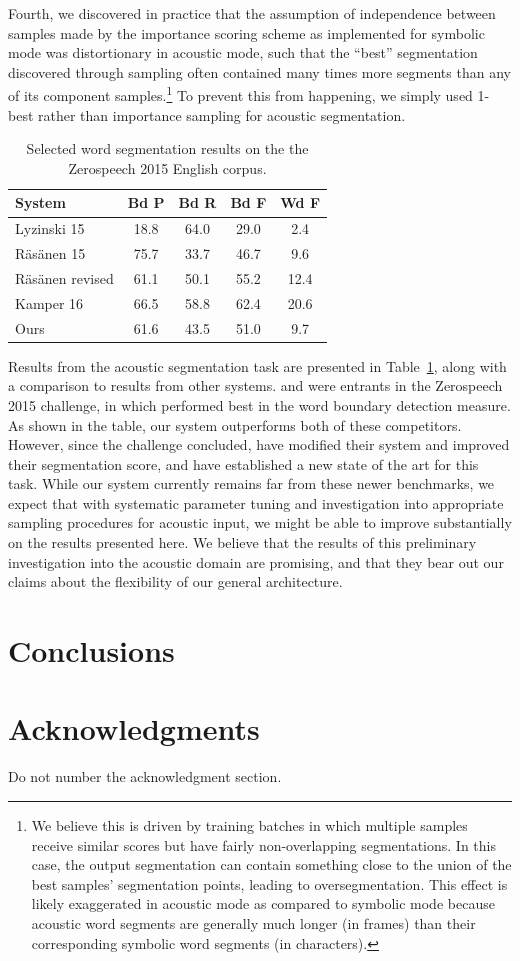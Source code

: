 \documentclass[11pt,letterpaper]{article}
\begin{document}
Fourth, we discovered in practice that the assumption of independence between samples made by the importance scoring scheme as implemented for symbolic mode was distortionary in acoustic mode, such that the ``best'' segmentation discovered through sampling often contained many times more segments than any of its component samples.\footnote{We believe this is driven by training batches in which multiple samples receive similar scores but have fairly non-overlapping segmentations.
In this case, the output segmentation can contain something close to the union of the best samples' segmentation points, leading to oversegmentation.
This effect is likely exaggerated in acoustic mode as compared to symbolic mode because acoustic word segments are generally much longer (in frames) than their corresponding symbolic word segments (in characters).}
To prevent this from happening, we simply used 1-best rather than importance sampling for acoustic segmentation.

\begin{table}
\begin{tabular}{p{2.1cm}cccc}
System & Bd P & Bd R & Bd F & Wd F\\
\hline
Lyzinski 15           & 18.8 & 64.0 & 29.0 & 2.4\\
R\"{a}s\"{a}nen 15       & 75.7 & 33.7 & 46.7 & 9.6\\
R\"{a}s\"{a}nen revised       & 61.1 & 50.1 & 55.2 & 12.4\\
Kamper 16       & 66.5 & 58.8 & 62.4 & 20.6\\
\hline
Ours & 61.6 & 43.5 & 51.0 & 9.7\\
\end{tabular}
\caption{Selected word segmentation results on the the Zerospeech 2015 English corpus.}
\label{tab-acoust-results}
\end{table}

Results from the acoustic segmentation task are presented in Table~\ref{tab-acoust-results}, along with a comparison to results from other systems.
 and  were entrants in the Zerospeech 2015 challenge, in which \cite{Rasanen15} performed best in the word boundary detection measure.
As shown in the table, our system outperforms both of these competitors.
However, since the challenge concluded,  have modified their system and improved their segmentation score, and  have established a new state of the art for this task.
While our system currently remains far from these newer benchmarks, we expect that with systematic parameter tuning and investigation into appropriate sampling procedures for acoustic input, we might be able to improve substantially on the results presented here.
We believe that the results of this preliminary investigation into the acoustic domain are promising, and that they bear out our claims about the flexibility of our general architecture.


\section{Conclusions}

\section*{Acknowledgments}

Do not number the acknowledgment section.



\end{document}
